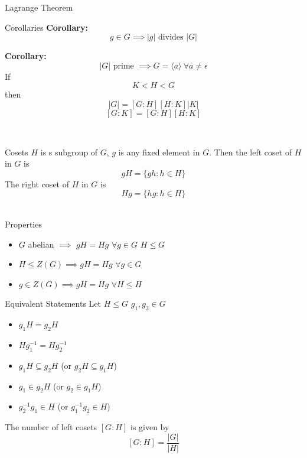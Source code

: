 \documentclass{article}
\begin{document}
\begin{multicols*}{3}
\begin{blackbox}{Lagrange Theorem}
\begin{bluebox}{Corollaries}
        \textbf{Corollary:}\\[-2ex]
        \[g \in G \implies |g| \text{ divides } |G|\]
        
        \textbf{Corollary:}\\[-2ex]
        \[|G| \text{ prime } \implies G = \langle a \rangle \ \forall a \neq \epsilon\]
        If 
        \[K < H < G\]
        then 
        \[|G| = [G : H][H : K] |K|\]
        \[[G:K] = [G:H][H:K]\]
    \end{bluebox}\\[-2ex]
\end{blackbox}
\begin{blackbox}{Cosets}
    $H$ is s subgroup of $G$, $g$ is any fixed element in $G$. Then the left coset of $H$ in $G$ is 
    \[gH = \{gh: h \in H\}\]
    The right coset of $H$ in $G$ is 
    \[Hg = \{hg: h \in H\}\]\\[-6ex]
    \begin{redbox}{Properties}
    \begin{itemize}
        \item $G$ abelian $\implies$ $gH = Hg$ $\forall g \in G$ $H \leq G$
        \item $H \leq Z(G) \implies gH = Hg$ $\forall g \in G$
        \item $g \in Z(G) \implies gH = Hg$ $\forall H \leq H$  
    \end{itemize}
    \begin{bluebox}{Equivalent Statements}
        Let $H \leq G$ $g_1, g_2 \in G$
        \begin{itemize}
            \item $g_1H = g_2H$ 
            \item $Hg_1^{-1} = Hg_2^{-1}$
            \item $g_1H \subseteq g_2H$ (or $g_2H \subseteq g_1H$)
            \item $g_1 \in g_2H$ (or $g_2 \in g_1H$)
            \item $g_2^{-1}g_1 \in H$ (or $g_1^{-1}g_2 \in H$)
        \end{itemize}
    \end{bluebox}
    \end{redbox}
    The number of left cosets $[G:H]$ is given by 
    \[[G: H] = \frac{|G|}{|H|}\]
\end{blackbox}
\end{multicols*}
\end{document}
